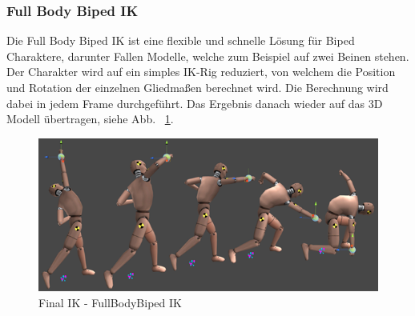 \subsubsection{Full Body Biped IK}

Die Full Body Biped IK ist eine flexible und schnelle Lösung für Biped Charaktere, darunter Fallen Modelle, welche zum Beispiel auf zwei Beinen stehen.
Der Charakter wird auf ein simples IK-Rig reduziert, von welchem die Position und Rotation der einzelnen Gliedmaßen berechnet wird.
Die Berechnung wird dabei in jedem Frame durchgeführt.
Das Ergebnis danach wieder auf das 3D Modell übertragen, siehe Abb. ~\ref{fig:finalIK_full_body_biped_ik}.
~\cite{FinalIK_FullBodyBipedIK_2021}

\begin {figure}
    \centering
    \includegraphics[scale=0.5]{pics/fullbodybipedIK}
    \caption{Final IK - FullBodyBiped IK}
    \label{fig:finalIK_full_body_biped_ik}
\end {figure}





